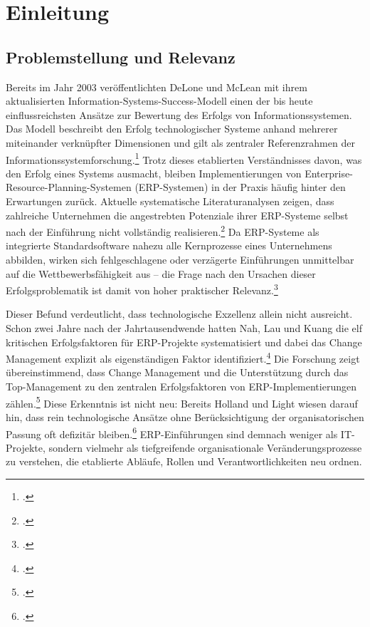 \section{Einleitung}

\subsection{Problemstellung und Relevanz}

Bereits im Jahr 2003 ver\"offentlichten DeLone und McLean mit ihrem aktualisierten Information-Systems-Success-Modell einen der bis heute einflussreichsten Ans\"atze zur Bewertung des Erfolgs von Informationssystemen. Das Modell beschreibt den Erfolg technologischer Systeme anhand mehrerer miteinander verkn\"upfter Dimensionen und gilt als zentraler Referenzrahmen der Informationssystemforschung.\footcite[Vgl.][S.~9--10]{delone2003} Trotz dieses etablierten Verst\"andnisses davon, was den Erfolg eines Systems ausmacht, bleiben Implementierungen von Enterprise-Resource-Planning-Systemen (ERP-Systemen) in der Praxis h\"aufig hinter den Erwartungen zur\"uck. Aktuelle systematische Literaturanalysen zeigen, dass zahlreiche Unternehmen die angestrebten Potenziale ihrer ERP-Systeme selbst nach der Einf\"uhrung nicht vollst\"andig realisieren.\footcite[Vgl.][S.~2--3]{butarbutar2023} Da ERP-Systeme als integrierte Standardsoftware nahezu alle Kernprozesse eines Unternehmens abbilden, wirken sich fehlgeschlagene oder verz\"agerte Einf\"uhrungen unmittelbar auf die Wettbewerbsf\"ahigkeit aus -- die Frage nach den Ursachen dieser Erfolgsproblematik ist damit von hoher praktischer Relevanz.\footcite[Vgl.][S.~241--242]{umble2003}

Dieser Befund verdeutlicht, dass technologische Exzellenz allein nicht ausreicht. Schon zwei Jahre nach der Jahrtausendwende hatten Nah, Lau und Kuang die elf kritischen Erfolgsfaktoren f\"ur ERP-Projekte systematisiert und dabei das Change Management explizit als eigenst\"andigen Faktor identifiziert.\footcite[Vgl.][S.~285]{nah2001} Die Forschung zeigt \"ubereinstimmend, dass Change Management und die Unterst\"utzung durch das Top-Management zu den zentralen Erfolgsfaktoren von ERP-Implementierungen z\"ahlen.\footcites[Vgl.][S.~1181--1190]{leyh2014}[][S.~258--259]{somers2004} Diese Erkenntnis ist nicht neu: Bereits Holland und Light wiesen darauf hin, dass rein technologische Ans\"atze ohne Ber\"ucksichtigung der organisatorischen Passung oft defizit\"ar bleiben.\footcite[Vgl.][S.~30--36]{holland1999} ERP-Einf\"uhrungen sind demnach weniger als IT-Projekte, sondern vielmehr als tiefgreifende organisationale Ver\"anderungsprozesse zu verstehen, die etablierte Abl\"aufe, Rollen und Verantwortlichkeiten neu ordnen.

